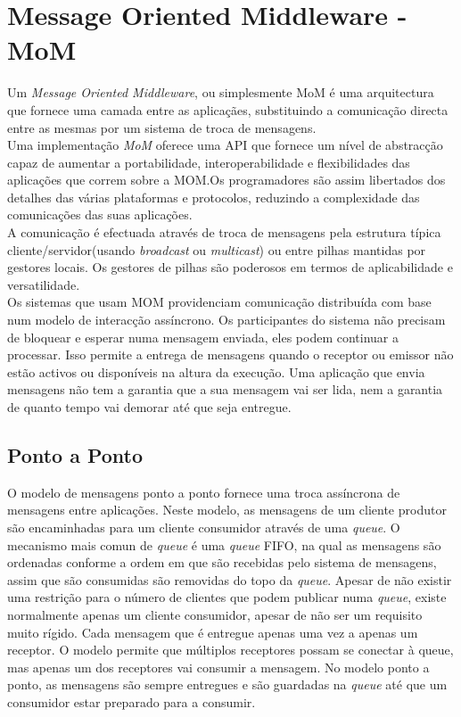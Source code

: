 \section{Message Oriented Middleware - MoM}
Um \textit{Message Oriented Middleware}, ou simplesmente MoM é uma arquitectura que fornece uma camada entre as aplicaçães, substituindo a comunicação directa entre as mesmas por um sistema de troca de mensagens.\\
Uma implementação \textit{MoM} oferece uma API que fornece um nível de abstracção capaz de aumentar a portabilidade, interoperabilidade e flexibilidades das aplicações que correm sobre a MOM.Os programadores são assim libertados dos detalhes das várias plataformas e protocolos, reduzindo a complexidade das comunicações das suas aplicações.\\
A comunicação é efectuada através de troca de mensagens pela estrutura típica cliente/servidor(usando \textit{broadcast} ou \textit{multicast}) ou entre pilhas mantidas por gestores locais. Os gestores de pilhas são poderosos em termos de aplicabilidade e versatilidade.\\ 
Os sistemas que usam MOM providenciam comunicação distribuída com base num modelo de interacção assíncrono. Os participantes do sistema não precisam de bloquear e esperar numa mensagem enviada, eles podem continuar a processar. Isso permite a entrega de mensagens quando o receptor ou emissor não estão activos ou disponíveis na altura da execução. Uma aplicação que envia mensagens não tem a garantia que a sua mensagem vai ser lida, nem  a garantia de quanto tempo vai demorar até que seja entregue. 
\subsection{Ponto a Ponto}
O modelo de mensagens ponto a ponto fornece uma troca assíncrona de mensagens entre aplicações. Neste modelo, as mensagens de um cliente produtor são encaminhadas para um cliente consumidor através de uma \textit{queue}. O mecanismo mais comun de \textit{queue} é uma \textit{queue} FIFO, na qual as mensagens são ordenadas conforme a ordem em que são recebidas pelo sistema de mensagens, assim que são consumidas são removidas do topo da \textit{queue}. 
Apesar de não existir uma restrição para o número de clientes que podem publicar numa \textit{queue}, existe normalmente apenas um cliente consumidor, apesar de não ser um requisito muito rígido. Cada mensagem que é entregue apenas uma vez a apenas um receptor. O modelo permite que múltiplos receptores possam se conectar à queue, mas apenas um dos receptores vai consumir a mensagem. No modelo ponto a ponto, as mensagens são sempre entregues e são guardadas na \textit{queue} até que um consumidor estar preparado para a consumir.  
